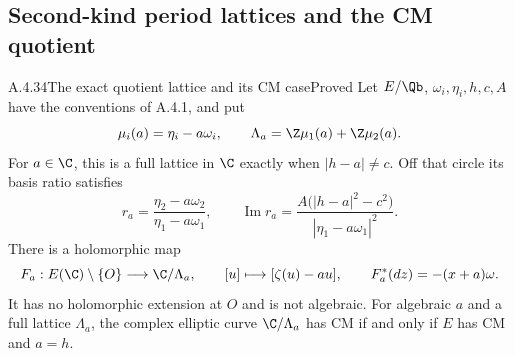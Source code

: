 
\subsection{Second-kind period lattices and the CM quotient}

\begin{result}{A.4.34}{The exact quotient lattice and its CM case}{Proved}
Let $E/\Qb$, $\omega_i,\eta_i,h,c,A$ have the conventions of A.4.1,
and put
\[
 \mu_i(a)=\eta_i-a\omega_i,\qquad
 \Lambda_a=\Z\mu_1(a)+\Z\mu_2(a).
\]
For $a\in\C$, this is a full lattice in $\C$ exactly when
$|h-a|\ne c$. Off that circle its basis ratio satisfies
\[
 r_a=\frac{\eta_2-a\omega_2}{\eta_1-a\omega_1},
 \qquad
 \operatorname{Im}r_a
 =\frac{A\bigl(|h-a|^2-c^2\bigr)}
        {|\eta_1-a\omega_1|^2}.
\]
There is a holomorphic map
\[
 F_a:E(\C)\setminus\{O\}\longrightarrow \C/\Lambda_a,
 \qquad [u]\longmapsto[\zeta(u)-au],
 \qquad F_a^*(dz)=-(x+a)\omega.
\]
It has no holomorphic extension at $O$ and is not algebraic.
For algebraic $a$ and a full lattice $\Lambda_a$, the complex elliptic
curve $\C/\Lambda_a$ has CM if and only if $E$ has CM and $a=h$.
\end{result}

